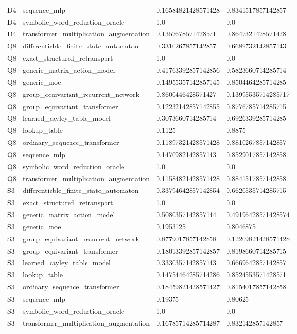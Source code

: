 \begin{table}[t]
\begin{tabular}{llll}
D4 & sequence\_mlp & 0.16584821428571428 & 0.8341517857142857 \\
D4 & symbolic\_word\_reduction\_oracle & 1.0 & 0.0 \\
D4 & transformer\_multiplication\_augmentation & 0.1352678571428571 & 0.8647321428571428 \\
Q8 & differentiable\_finite\_state\_automaton & 0.3310267857142857 & 0.6689732142857143 \\
Q8 & exact\_structured\_retransport & 1.0 & 0.0 \\
Q8 & generic\_matrix\_action\_model & 0.41763392857142856 & 0.5823660714285714 \\
Q8 & generic\_moe & 0.14955357142857145 & 0.8504464285714285 \\
Q8 & group\_equivariant\_recurrent\_network & 0.8600446428571427 & 0.13995535714285717 \\
Q8 & group\_equivariant\_transformer & 0.12232142857142855 & 0.8776785714285715 \\
Q8 & learned\_cayley\_table\_model & 0.3073660714285714 & 0.6926339285714285 \\
Q8 & lookup\_table & 0.1125 & 0.8875 \\
Q8 & ordinary\_sequence\_transformer & 0.11897321428571428 & 0.8810267857142857 \\
Q8 & sequence\_mlp & 0.1470982142857143 & 0.8529017857142858 \\
Q8 & symbolic\_word\_reduction\_oracle & 1.0 & 0.0 \\
Q8 & transformer\_multiplication\_augmentation & 0.11584821428571428 & 0.8841517857142858 \\
S3 & differentiable\_finite\_state\_automaton & 0.33794642857142854 & 0.6620535714285715 \\
S3 & exact\_structured\_retransport & 1.0 & 0.0 \\
S3 & generic\_matrix\_action\_model & 0.5080357142857144 & 0.49196428571428574 \\
S3 & generic\_moe & 0.1953125 & 0.8046875 \\
S3 & group\_equivariant\_recurrent\_network & 0.8779017857142858 & 0.12209821428571428 \\
S3 & group\_equivariant\_transformer & 0.18013392857142857 & 0.8198660714285715 \\
S3 & learned\_cayley\_table\_model & 0.3330357142857143 & 0.6669642857142857 \\
S3 & lookup\_table & 0.14754464285714286 & 0.8524553571428571 \\
S3 & ordinary\_sequence\_transformer & 0.18459821428571427 & 0.8154017857142858 \\
S3 & sequence\_mlp & 0.19375 & 0.80625 \\
S3 & symbolic\_word\_reduction\_oracle & 1.0 & 0.0 \\
S3 & transformer\_multiplication\_augmentation & 0.16785714285714287 & 0.832142857142857 \\
\bottomrule
\end{tabular}
\end{table}
